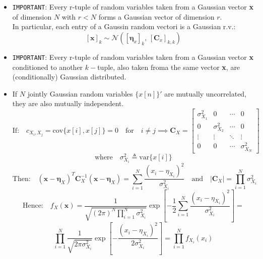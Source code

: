 \begin{itemize}
\[
= E\left\{ \mathbf{A}(\mathbf{x} - \mathbf{\eta}_x)(\mathbf{x} - \mathbf{\eta}_x)^T \mathbf{A}^T \right\}
= \mathbf{A} E\left\{ (\mathbf{x} - \mathbf{\eta}_x)(\mathbf{x} - \mathbf{\eta}_x)^T \right\} \mathbf{A}^T
= \mathbf{A}\mathbf{C}_x\mathbf{A}^T
\]
\item \texttt{IMPORTANT}: Every r-tuple of random variables taken from a Gaussian vector \textbf{x} of dimension \(N\) with \(r<N\) forms a Gaussian vector of dimension \(r\).  \\
In particular, each entry of a Gaussin random vectori is a Gaussian r.v.:
\[
\left[ \mathbf{x} \right]_k \sim \mathcal{N}\left( \left[ \mathbf{\eta}_x \right]_k,\, \left[ \mathbf{C}_x \right]_{k,k} \right)
\]
\item \texttt{IMPORTANT}: Every r-tuple of random variables taken from a Gaussian vector \textbf{x} conditioned to another \(k-\)tuple, also taken froma the same vector \textbf{x}, are (conditionally) Gaussian distributed.
\item If \(N\) jointly Gaussian random variables \(\{x[n]\}'\) are mutually uncorrelated, they are also mutually independent.
\newpage
\[
\text{If:} \quad c_{X_i, X_j} = \mathrm{cov}\{x[i], x[j]\} = 0 \quad \text{for} \quad i \neq j \implies \mathbf{C}_X =
\begin{bmatrix}
\sigma_{X_1}^2 & 0 & \cdots & 0 \\
0 & \sigma_{X_2}^2 & \cdots & 0 \\
\vdots & \vdots & \ddots & \vdots \\
0 & 0 & \cdots & \sigma_{X_N}^2
\end{bmatrix}
\, \] 
\[
\text{where} \quad \sigma_{X_i}^2 \triangleq \mathrm{var}\{x[i]\}
\]\[
\text{Then:} \quad
(\mathbf{x} - \boldsymbol{\eta}_X)^T \mathbf{C}_X^{-1} (\mathbf{x} - \boldsymbol{\eta}_X) =
\sum_{i=1}^N \frac{(x_i - \eta_{X_i})^2}{\sigma_{X_i}^2}
\quad \text{and} \quad
|\mathbf{C}_X| = \prod_{i=1}^N \sigma_{X_i}^2 
\]\[
\text{Hence:} \quad
f_X(\mathbf{x}) = \frac{1}{\sqrt{(2\pi)^N \prod_{i=1}^N \sigma_{X_i}^2}}
\exp\left[-\frac{1}{2} \sum_{i=1}^N \frac{(x_i - \eta_{X_i})^2}{\sigma_{X_i}^2}\right]
= \]\[\prod_{i=1}^N \frac{1}{\sqrt{2\pi \sigma_{X_i}^2}} \exp\left[
-\frac{(x_i - \eta_{X_i})^2}{2\sigma_{X_i}^2}
\right]
= \prod_{i=1}^N f_{X_i}(x_i)
\]
\end{itemize}
